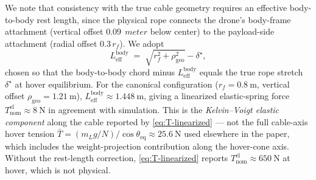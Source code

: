 We note that consistency with the true cable geometry requires an effective body-to-body rest length, since the physical rope connects the drone's body-frame attachment (vertical offset $\SI{0.09}{\ meter}$ below center) to the payload-side attachment (radial offset $0.3\,r_f$). We adopt
\begin{equation}
  L_{\mathrm{eff}}^{\mathrm{body}}
    \;=\; \sqrt{r_f^2 + \rho_{\mathrm{geo}}^2} - \delta^\star,
  \label{eq:Leff}
\end{equation}
chosen so that the body-to-body chord minus $L_{\mathrm{eff}}^{\mathrm{body}}$ equals the true rope stretch $\delta^\star$ at hover equilibrium. For the canonical configuration ($r_f = \SI{0.8}{\metre}$, vertical offset $\rho_{\mathrm{geo}} = \SI{1.21}{\metre}$), $L_{\mathrm{eff}}^{\mathrm{body}} \approx \SI{1.448}{\metre}$, giving a linearized elastic-spring force $T_{\mathrm{nom}}^{\mathrm{el}} \approx \SI{8}{\newton}$ in agreement with simulation. This is the \emph{Kelvin--Voigt elastic component} along the cable reported by \eqref{eq:T-linearized} --- not the full cable-axis hover tension $\bar T = (m_L g / N) / \cos\theta_{\mathrm{eq}} \approx \SI{25.6}{\newton}$ used elsewhere in the paper, which includes the weight-projection contribution along the hover-cone axis. Without the rest-length correction, \eqref{eq:T-linearized} reports $T_{\mathrm{nom}}^{\mathrm{el}} \approx \SI{650}{\newton}$ at hover, which is not physical.


